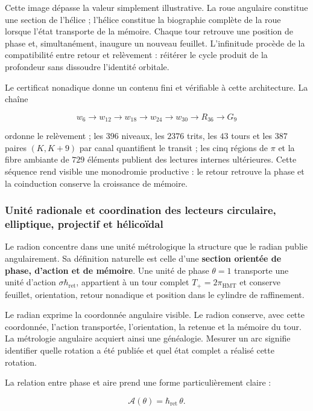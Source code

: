 Cette image dépasse la valeur simplement illustrative. La roue angulaire constitue une section de l'hélice ; l'hélice constitue la biographie complète de la roue lorsque l'état transporte de la mémoire. Chaque tour retrouve une position de phase et, simultanément, inaugure un nouveau feuillet. L'infinitude procède de la compatibilité entre retour et relèvement : réitérer le cycle produit de la profondeur sans dissoudre l'identité orbitale.

Le certificat nonadique donne un contenu fini et vérifiable à cette architecture. La chaîne

\[
w_6\longrightarrow w_{12}\longrightarrow w_{18}\longrightarrow
w_{24}\longrightarrow w_{30}\longrightarrow R_{36}\longrightarrow G_9
\]

ordonne le relèvement ; les \(396\) niveaux, les \(2376\) trits, les \(43\) tours et les \(387\) paires \((K,K+9)\) par canal quantifient le transit ; les cinq régions de \(\pi\) et la fibre ambiante de \(729\) éléments publient des lectures internes ultérieures. Cette séquence rend visible une monodromie productive : le retour retrouve la phase et la coinduction conserve la croissance de mémoire.

\subsubsection{Unité radionale et coordination des lecteurs circulaire, elliptique, projectif et hélicoïdal}

Le radion concentre dans une unité métrologique la structure que le radian publie angulairement. Sa définition naturelle est celle d'une \textbf{section orientée de phase, d'action et de mémoire}. Une unité de phase \(\theta=1\) transporte une unité d'action \(\sigma\hbar_{\mathrm{ret}}\), appartient à un tour complet \(T_+=2\pi_{\mathrm{HMT}}\) et conserve feuillet, orientation, retour nonadique et position dans le cylindre de raffinement.

Le radian exprime la coordonnée angulaire visible. Le radion conserve, avec cette coordonnée, l'action transportée, l'orientation, la retenue et la mémoire du tour. La métrologie angulaire acquiert ainsi une généalogie. Mesurer un arc signifie identifier quelle rotation a été publiée et quel état complet a réalisé cette rotation.

La relation entre phase et aire prend une forme particulièrement claire :

\[
\mathcal A(\theta)=\hbar_{\mathrm{ret}}\,\theta.
\]

